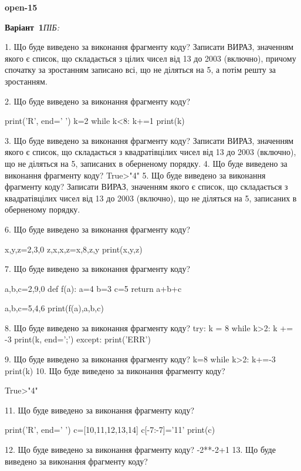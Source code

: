 \documentclass[11pt]{article}
\begin{document}
{\large\textbf{open-15}}

\textbf{Варіант \No\,1}\hfill \textit{ПІБ:}\,\underline{\hspace{60mm}}
\vspace{4mm}

1. Що буде виведено за виконання фрагменту коду?
Записати ВИРАЗ, значенням якого є список, що складається з цілих чисел від 13 до 2003 (включно), причому спочатку за зростанням записано всі, що не діляться на 5, а потім решту за зростанням.

2. Що буде виведено за виконання фрагменту коду?

print('R', end=' ')
k=2
while k<8:
    k+=1
print(k)


3. Що буде виведено за виконання фрагменту коду?
Записати ВИРАЗ, значенням якого є список, що складається з квадратівцілих чисел від 13 до 2003 (включно), що не діляться на 5, записаних в оберненому порядку.
4. Що буде виведено за виконання фрагменту коду?
True>"4"
5. Що буде виведено за виконання фрагменту коду?
Записати ВИРАЗ, значенням якого є список, що складається з квадратівцілих чисел від 13 до 2003 (включно), що не діляться на 5, записаних в обернено\-му порядку.

6. Що буде виведено за виконання фрагменту коду?

x,y,z=2,3,0
z,x,x,z=x,8,z,y
print(x,y,z)

7. Що буде виведено за виконання фрагменту коду?

a,b,c=2,9,0
def f(a):
    a=4
    b=3
    c=5
    return a+b+c

a,b,c=5,4,6
print(f(a),a,b,c)

8. Що буде виведено за виконання фрагменту коду?
try:
    k = 8
    while k>2:
        k += -3
    print(k, end=';')
except:
    print('ERR')

9. Що буде виведено за виконання фрагменту коду?
k=8
   while k>2: k+=-3
   print(k)
10. Що буде виведено за виконання фрагменту коду?

True>"4"

11. Що буде виведено за виконання фрагменту коду?

print('R', end=' ')
c=[10,11,12,13,14]
c[-7:-7]='11'
print(c)


12. Що буде виведено за виконання фрагменту коду?
-2**-2+1
13. Що буде виведено за виконання фрагменту коду?
\end{document}
